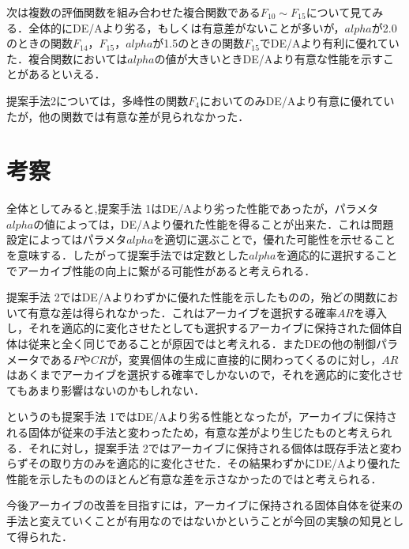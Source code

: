 \documentclass[a4paper,11pt,oneside,openany]{jsbook}
\begin{document}
次は複数の評価関数を組み合わせた複合関数である$F_{10}{\sim}F_{15}$について見てみる．全体的にDE/Aより劣る，もしくは有意差がないことが多いが，$alpha$が2.0のときの関数$F_{14}$，$F_{15}$，$alpha$が1.5のときの関数$F_{15}$でDE/Aより有利に優れていた．複合関数においては$alpha$の値が大きいときDE/Aより有意な性能を示すことがあるといえる．

提案手法2については，多峰性の関数$F_{4}$においてのみDE/Aより有意に優れていたが，他の関数では有意な差が見られなかった．

\section{考察}
全体としてみると,提案手法 1はDE/Aより劣った性能であったが，パラメタ$alpha$の値によっては，DE/Aより優れた性能を得ることが出来た．これは問題設定によってはパラメタ$alpha$を適切に選ぶことで，優れた可能性を示せることを意味する．したがって提案手法では定数とした$alpha$を適応的に選択することでアーカイブ性能の向上に繋がる可能性があると考えられる．

提案手法 2ではDE/Aよりわずかに優れた性能を示したものの，殆どの関数において有意な差は得られなかった．これはアーカイブを選択する確率$AR$を導入し，それを適応的に変化させたとしても選択するアーカイブに保持された個体自体は従来と全く同じであることが原因ではと考えれる．またDEの他の制御パラメータである$F$や$CR$が，変異個体の生成に直接的に関わってくるのに対し，$AR$はあくまでアーカイブを選択する確率でしかないので，それを適応的に変化させてもあまり影響はないのかもしれない．

というのも提案手法 1ではDE/Aより劣る性能となったが，アーカイブに保持される固体が従来の手法と変わったため，有意な差がより生じたものと考えられる．それに対し，提案手法 2ではアーカイブに保持される個体は既存手法と変わらずその取り方のみを適応的に変化させた．その結果わずかにDE/Aより優れた性能を示したもののほとんど有意な差を示さなかったのではと考えられる．

今後アーカイブの改善を目指すには，アーカイブに保持される固体自体を従来の手法と変えていくことが有用なのではないかということが今回の実験の知見として得られた．
\end{document}
